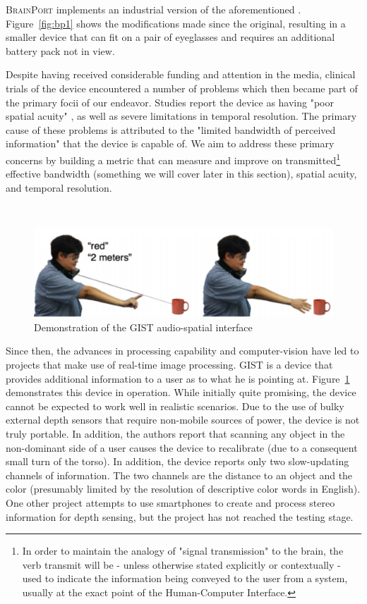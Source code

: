 \documentclass[
12pt, %
oneside, %
english, %
doublespacing, %
headsepline, %
]{MastersDoctoralThesis} %
\begin{document}
\textsc{BrainPort} \parencite{upson_tongue_2007} implements an industrial version of the aforementioned \parencite{bach-y-rita_seeing_nodate}. Figure~\ref{fig:bp1} shows the modifications made since the original, resulting in a smaller device that can fit on a pair of eyeglasses and requires an additional battery pack not in view.

Despite having received considerable funding and attention in the media, clinical trials of the device \parencite{nau_acquisition_2015} encountered a number of problems which then became part of the primary focii of our endeavor. Studies report the device as having "poor spatial acuity" \parencite{stronks_visual_2016}, as well as severe limitations in temporal resolution. The primary cause of these problems is attributed to the "limited bandwidth of perceived information" that the device is capable of. We aim to address these primary concerns by building a metric that can measure and improve on transmitted\footnote{In order to maintain the analogy of "signal transmission" to the brain, the verb transmit will be - unless otherwise stated explicitly or contextually - used to indicate the information being conveyed to the user from a system, usually at the exact point of the Human-Computer Interface.} effective bandwidth (something we will cover later in this section), spatial acuity, and temporal resolution.

\,

\begin{figure}[ht]
\centering
\includegraphics[width=0.7\linewidth]{images/GIST.png}
\decoRule
\caption[GIST Interface]{Demonstration of the GIST audio-spatial interface}
\label{fig:gist}
\end{figure}

Since then, the advances in processing capability and computer-vision have led to projects that make use of real-time image processing. \textsc{GIST} \citep{khambadkar_gist:_2013} is a device that provides additional information to a user as to what he is pointing at. Figure~\ref{fig:gist} demonstrates this device in operation. While initially quite promising, the device cannot be expected to work well in realistic scenarios. Due to the use of bulky external depth sensors that require non-mobile sources of power, the device is not truly portable. In addition, the authors report that scanning any object in the non-dominant side of a user causes the device to recalibrate (due to a consequent small turn of the torso). In addition, the device reports only two slow-updating channels of information. The two channels are the distance to an object and the color (presumably limited by the resolution of descriptive color words in English). One other project \parencite{akhter_smartphone-based_2011} attempts to use smartphones to create and process stereo information for depth sensing, but the project has not reached the testing stage.
\end{document}
